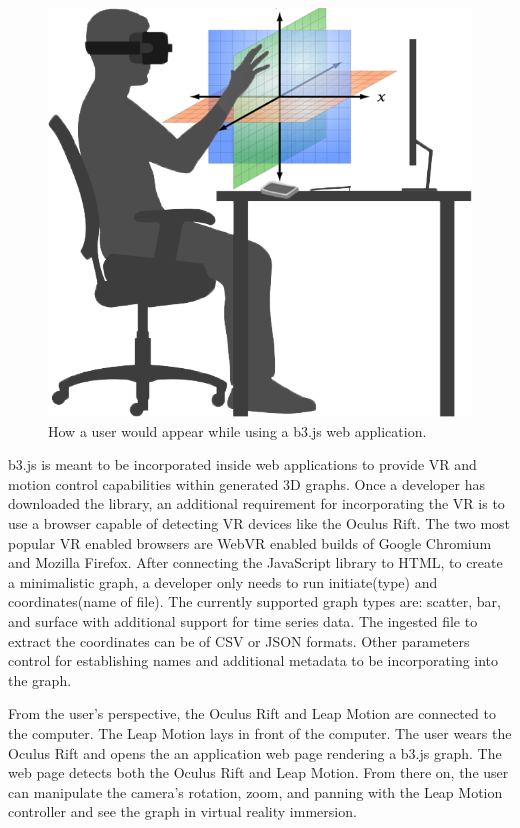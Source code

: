 \documentclass{vgtc}                          %
\begin{document}
\begin{figure}[t]
\begin{center}
   \includegraphics[width=0.75\linewidth]{figure3}
\end{center}
   \caption{How a user would appear while using a b3.js web application.}
\end{figure}

b3.js is meant to be incorporated inside web applications to provide VR and motion control capabilities within generated 3D graphs. Once a developer has downloaded the library, an additional requirement for incorporating the VR is to use a browser capable of detecting VR devices like the Oculus Rift. The two most popular VR enabled browsers are WebVR enabled builds of Google Chromium and Mozilla Firefox. After connecting the JavaScript library to HTML, to create a minimalistic graph, a developer only needs to run initiate(type) and coordinates(name of file). The currently supported graph types are: scatter, bar, and surface with additional support for time series data. The ingested file to extract the coordinates can be of CSV or JSON formats. Other parameters control for establishing names and additional metadata to be incorporating into the graph.

From the user’s perspective, the Oculus Rift and Leap Motion are connected to the computer. The Leap Motion lays in front of the computer. The user wears the Oculus Rift and opens the an application web page rendering a b3.js graph. The web page detects both the Oculus Rift and Leap Motion. From there on, the user can manipulate the camera’s rotation, zoom, and panning with the Leap Motion controller and see the graph in virtual reality immersion.
\end{document}
